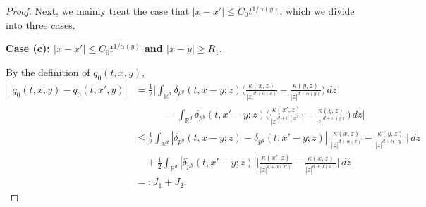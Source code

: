 \documentclass[a4paper,11pt]{amsart}
\renewcommand{\le}{\leqslant}
\renewcommand{\ge}{\geqslant}
\newcommand{\R}{\mathds R}
\newcommand{\A}{\alpha}
\theoremstyle{definition}
\begin{document}
\begin{proof}
Next, we mainly treat the case that $|x-x'|\le C_0t^{1/\A(y)}$,
which we divide into three cases.

{\bf Case (c): $|x-x'|\le C_0t^{1/\A(y)}$ and $|x-y|\ge R_1$.}

By the definition of $q_0(t,x,y)$,
\begin{equation}\label{p3-1-2aa}
\begin{split}
 |q_0(t,x,y)-q_0(t,x',y)|
&=\frac{1}{2}\bigg|\int_{\R^d} \delta_{p^y}(t,x-y;z)\bigg(\frac{\kappa(x,z)}{|z|^{d+\alpha(x)}}-\frac{\kappa(y,z)}{|z|^{d+\alpha(y)}} \bigg)\,dz\\
&\qquad\quad-\int_{\R^d} \delta_{p^y}(t,x'-y;z)\bigg(\frac{\kappa(x',z)}{|z|^{d+\alpha(x')}}-\frac{\kappa(y,z)}{|z|^{d+\alpha(y)}} \bigg)\,dz\bigg|\\
&\le \frac{1}{2}\int_{\R^d} |\delta_{p^y}(t,x-y;z)-\delta_{p^y}(t,x'-y;z)| \bigg|\frac{\kappa(x,z)}{|z|^{d+\alpha(x)}}-\frac{\kappa(y,z)}{|z|^{d+\alpha(y)}} \bigg|\,dz\\
&\quad+ \frac{1}{2}\int_{\R^d} |\delta_{p^y}(t,x'-y;z)| \bigg|\frac{\kappa(x',z)}{|z|^{d+\alpha(x')}}-\frac{\kappa(x,z)}{|z|^{d+\alpha(x)}} \bigg|\,dz\\
&=:J_1+J_2.
\end{split}
\end{equation}



\end{proof}
\end{document}

